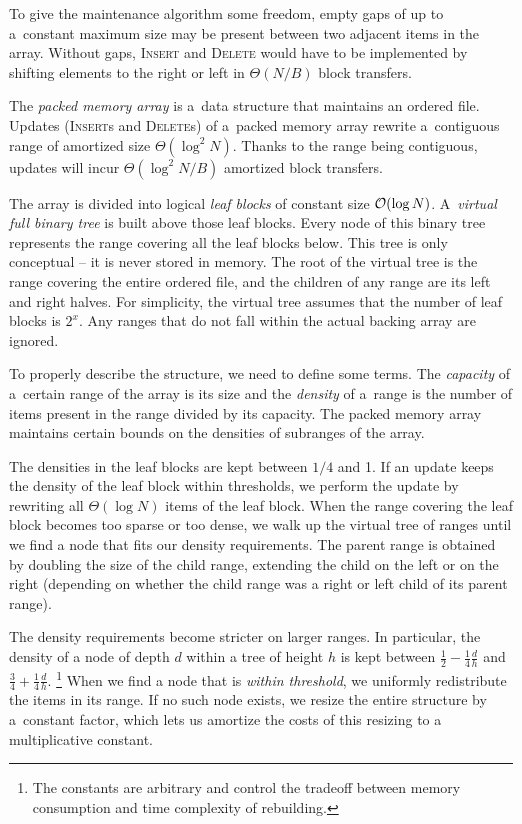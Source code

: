 To give the maintenance algorithm some freedom, empty gaps of up to a~constant
maximum size may be present between two adjacent items in the array. Without
gaps, \textsc{Insert} and \textsc{Delete} would have to be implemented
by shifting elements to the right or left in $\Theta(N/B)$ block transfers.

The \emph{packed memory array} is a~data structure that maintains an ordered
file. Updates (\textsc{Insert}s and \textsc{Delete}s) of a~packed memory array
rewrite a~contiguous range of amortized size $\Theta(\log^2 N)$.
Thanks to the range being contiguous, updates will incur
$\Theta(\log^2 N / B)$ amortized block transfers.

The array is divided into logical \emph{leaf blocks} of constant size
$\mathcal{O}(\log N)$. A~\emph{virtual full binary tree} is built above those leaf
blocks. Every node of this binary tree represents the range covering all
the leaf blocks below. This tree is only conceptual -- it is never stored
in memory. The root of the virtual tree is the range covering the entire
ordered file, and the children of any range are its left and right halves.
For simplicity, the virtual tree assumes that the number of leaf blocks
is $2^x$. Any ranges that do not fall within the actual backing array
are ignored.

To properly describe the structure, we need to define some terms. The
\emph{capacity} of a~certain range of the array is its size and the
\emph{density} of a~range is the number of items present in the range divided
by its capacity.
The packed memory array maintains certain bounds on the densities of subranges
of the array.

The densities in the leaf blocks are kept between $1/4$ and 1.
If an update keeps the density of the leaf block within thresholds, we perform
the update by rewriting all $\Theta(\log N)$ items of the leaf block.
When the range covering the leaf block becomes too sparse or too dense, we
walk up the virtual tree of ranges until we find a node that fits our density
requirements. The parent range is obtained by doubling the size of the child
range, extending the child on the left or on the right (depending on
whether the child range was a right or left child of its parent range).

The density requirements become stricter on larger ranges.
In particular, the density of a node of depth $d$ within a tree of height $h$
is kept between $\frac{1}{2}-\frac{1}{4}\frac{d}{h}$ and
$\frac{3}{4}+\frac{1}{4}\frac{d}{h}$.
\footnote{The constants are arbitrary and control the tradeoff
between memory consumption and time complexity of rebuilding.}
When we find a node that is \emph{within threshold}, we uniformly redistribute
the items in its range. If no such node exists, we resize the entire structure
by a~constant factor, which lets us amortize the costs of this resizing to
a multiplicative constant.

